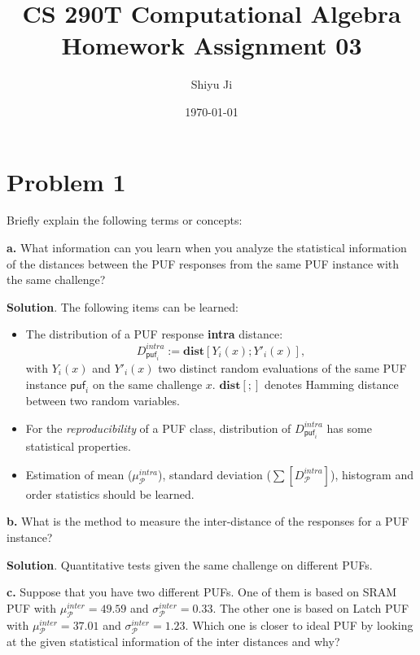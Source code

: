 \documentclass[12pt]{article}
\theoremstyle{plain}
\begin{document}
\title{CS 290T Computational Algebra Homework Assignment 03}
\author{Shiyu Ji}
\date{\today}
\maketitle

\newcommand{\m}[1]{\begin{bmatrix}#1\end{bmatrix}}
\newcommand{\rank}[1]{\operatorname{rank}(#1)}
\newcommand{\F}{\mathbb{F}}
\newcommand{\Sol}{\textbf{Solution}. }

\section{Problem 1}
Briefly explain the following terms or concepts:

{\bf a.} What information can you learn when you analyze the statistical
information of the distances between the PUF responses from the
same PUF instance with the same challenge?

\newcommand{\p}{\mathcal{P}}
\newcommand{\puf}{\textsf{puf}}
\newcommand{\dist}{\textbf{dist}}
\Sol The following items can be learned:
\begin{itemize}
\item The distribution of a PUF response {\bf intra} distance:
$$D_{\puf_i}^{intra} := \dist[Y_i(x); Y'_i(x)],$$
with $Y_i(x)$ and $Y'_i(x)$ two distinct random evaluations of the same PUF instance $\puf_i$ on the same challenge $x$. $\dist[;]$ denotes Hamming distance between two random variables.
\item For the \emph{reproducibility} of a PUF class, distribution of $D_{\puf_i}^{intra}$ has some statistical properties.
\item Estimation of mean ($\mu_{\p}^{intra}$), standard deviation ($\sum[D_{\p}^{intra}]$), histogram and order statistics should be learned.
\end{itemize}

{\bf b.} What is the method to measure the inter-distance of the responses
for a PUF instance?

\Sol Quantitative tests given the same challenge on different PUFs.


{\bf c.} Suppose that you have two different PUFs. One of them is based
on SRAM PUF with $\mu_{\p}^{inter} = 49.59$ and $\sigma_{\p}^{inter} = 0.33$. The other one is based on Latch PUF with $\mu_{\p}^{inter} = 37.01$ and $\sigma_{\p}^{inter} = 1.23$. Which one is closer to ideal PUF by looking at the given statistical
information of the inter distances and why?
\end{document}

